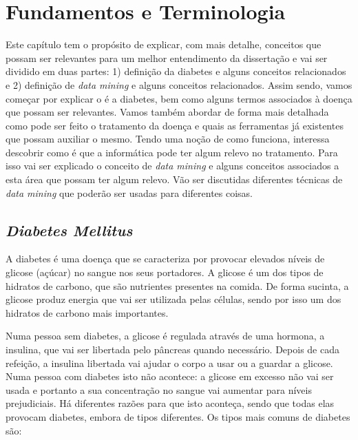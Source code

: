 \chapter{Fundamentos e Terminologia}\label{chap:concepts}

Este capítulo tem o propósito de explicar, com mais detalhe, conceitos que possam ser relevantes para um melhor entendimento da dissertação e vai ser dividido em duas partes: 1) definição da diabetes e alguns conceitos relacionados e 2) definição de \textit{data mining} e alguns conceitos relacionados. 
Assim sendo, vamos começar por explicar o é a diabetes, bem como alguns termos associados à doença que possam ser relevantes. Vamos também abordar de forma mais detalhada como pode ser feito o tratamento da doença e quais as ferramentas já existentes que possam auxiliar o mesmo. 
Tendo uma noção de como funciona, interessa descobrir como é que a informática pode ter algum relevo no tratamento. Para isso vai ser explicado o conceito de \textit{data mining} e alguns conceitos associados a esta área que possam ter algum relevo. Vão ser discutidas diferentes técnicas de \textit{data mining} que poderão ser usadas para diferentes coisas.

\section{\textit{Diabetes Mellitus}}

A diabetes é uma doença que se caracteriza por provocar elevados níveis de glicose (açúcar) no sangue nos seus portadores. A glicose é um dos tipos de hidratos de carbono, que são nutrientes presentes na comida. De forma sucinta, a glicose produz energia que vai ser utilizada pelas células, sendo por isso um dos hidratos de carbono mais importantes. 

Numa pessoa sem diabetes, a glicose é regulada através de uma hormona, a insulina, que vai ser libertada pelo pâncreas quando necessário. Depois de cada refeição, a insulina libertada vai ajudar o corpo a usar ou a guardar a glicose. 
Numa pessoa com diabetes isto não acontece: a glicose em excesso não vai ser usada e portanto a sua concentração no sangue vai aumentar para níveis prejudiciais. Há diferentes razões para que isto aconteça, sendo que todas elas provocam diabetes, embora de tipos diferentes. Os tipos mais comuns de diabetes são:

